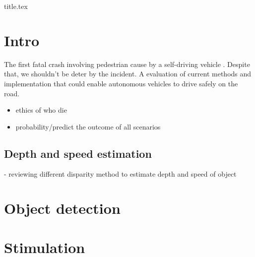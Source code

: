 \documentclass[12pt]{article}
\begin{document}
{title.tex}

\newpage
{}

\tableofcontents
\listoffigures
\listoftables
\newpage

\section{Intro}

The first fatal crash involving pedestrian cause by a self-driving vehicle \autocite{Uberkill}. Despite that, we shouldn't be deter by the incident. A evaluation of current methods and implementation that could enable autonomous vehicles to drive safely on the road.
\begin{itemize}

  \item ethics of who die
  \item probability/predict the outcome of all scenarios
\end{itemize}

\subsection{Depth and speed estimation}
 - reviewing different disparity method to estimate depth and speed of object

\section{}
\subsection{}
\subsection{}

\section{Object detection}

\section{Stimulation}

\textcite{dresner2008multiagent}
\autocite{dresner2004multiagent}

\newpage

\raggedright
%
\printbibliography
\end{document}
